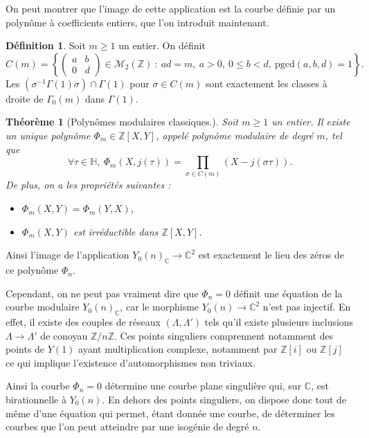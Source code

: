 \documentclass[11pt,a4paper]{article}
\newcommand{\Z}{\mathbb{Z}}
\newcommand{\C}{\mathbb{C}}
\renewcommand{\H}{\mathbb{H}}
\newcommand{\M}{\mathcal{M}}
\newcommand{\vers}{\longrightarrow}
\newtheorem*{thm}{Théorème}
\theoremstyle{definition}
\newtheorem*{defi}{Définition}
\begin{document}
On peut montrer que l'image de cette application est la courbe définie par un polynôme à coefficients entiers, que l'on introduit maintenant.

\begin{defi}
Soit $m\geq 1$ un entier. On définit
$$C(m)=\left\{ 
\left(
\begin{matrix}
a & b \\
0 & d 
\end{matrix}
\right)
\in \M_2(\Z)\ :\ ad=m,\ a>0,\ 0\leq b<d,\ \mathrm{pgcd}(a,b,d)=1\right\}.$$
Les $(\sigma^{-1}\Gamma(1)\sigma)\cap \Gamma(1)$ pour $\sigma\in C(m)$ sont exactement les classes à droite de $\Gamma_0(m)$ dans $\Gamma(1)$.
\end{defi}


\begin{thm}[Polynômes modulaires classiques.]

Soit $m\geq 1$ un entier. Il existe un unique  polynôme $\Phi_m \in \Z[X,Y]$, appelé \emph{polynôme modulaire} de degré $m$, tel que
$$\forall \tau\in\H,\ \Phi_m(X,j(\tau))=\prod_{\sigma\in C(m)} (X-j(\sigma\tau)).$$
De plus, on a les propriétés suivantes :

\begin{itemize}
\item[(i)] $\Phi_m(X,Y)=\Phi_m(Y,X)$,
\item[(ii)] $\Phi_m(X,Y)$ est irréductible dans $\Z[X,Y]$.
\end{itemize}

\end{thm}

Ainsi l'image de l'application $Y_0(n)_\C\vers \C^2$ est exactement le lieu des zéros de ce polynôme $\Phi_n$.

Cependant, on ne peut pas vraiment dire que $\Phi_n=0$ définit une équation de la courbe modulaire $Y_0(n)_\C$, car le morphisme $Y_0(n)\vers \C^2$ n'est pas injectif. En effet, il existe des couples de réseaux $(\Lambda, \Lambda')$ tels qu'il existe plusieurs inclusions $\Lambda\vers\Lambda'$ de conoyau $\Z/n\Z$. Ces points singuliers comprennent notamment des points de $Y(1)$ ayant multiplication complexe, notamment par $\Z[i]$ ou $\Z[j]$ ce qui implique l'existence d'automorphismes non triviaux.

Ainsi la courbe $\Phi_n=0$ détermine une courbe plane singulière qui, sur $\C$, est birationnelle à $Y_0(n)$. En dehors des points singuliers, on dispose donc tout de même d'une équation qui permet, étant donnée une courbe, de déterminer les courbes que l'on peut atteindre par une isogénie de degré $n$.
\end{document}
